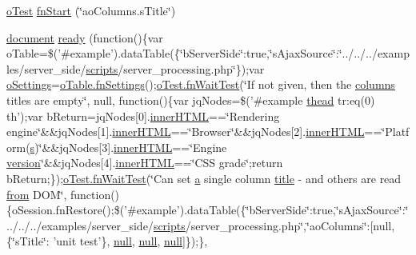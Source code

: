 \begin{DoxyCompactItemize}
\item 
\hyperlink{unit__test_8js_a3b2d259e2df3b6860d9047a92d09d0d6}{o\+Test} \hyperlink{4__server-side_2ao_columns_8s_title_8js_aa9448c4f49cc434654fabb45d95df796}{fn\+Start} (\char`\"{}ao\+Columns.\+s\+Title\char`\"{})
\item 
\hyperlink{outside_events_8js_aa14f8e0338cced6720590fd2ea13bd4b}{document} \hyperlink{4__server-side_2ao_columns_8s_title_8js_ad411188a091c47b7237e30912ec512bd}{ready} (function()\{var o\+Table=\$('\#example').data\+Table(\{\char`\"{}b\+Server\+Side\char`\"{}\+:true,\char`\"{}s\+Ajax\+Source\char`\"{}\+:\char`\"{}../../../examples/server\+\_\+side/\hyperlink{tinymce_8jquery_8dev_8js_a09066d4d580eeec222f858d588b4cdef}{scripts}/server\+\_\+processing.\+php\char`\"{}\});var \hyperlink{model_8settings_8js_a4857b9c813b4dea010668e9555d0aca7}{o\+Settings}=\hyperlink{api_8methods_8js_a78f387fab92a85c2cb7830bc5d8a6141}{o\+Table.\+fn\+Settings}();\hyperlink{onhold_24__server-side_2__zero__config_8js_ab25c4d596771c0133cdc45178ce72c3d}{o\+Test.\+fn\+Wait\+Test}(\char`\"{}If not given, then the \hyperlink{model_8defaults_8columns_8js_af310571d7a4fac04bd949bdefb852a47}{columns} titles are empty\char`\"{}, null, function()\{var jq\+Nodes=\$('\#example \hyperlink{core_8constructor_8js_a856be760b6816c9591ce69f0a2b43693}{thead} tr\+:eq(0) th');var b\+Return=jq\+Nodes\mbox{[}0\mbox{]}.\hyperlink{jquery-ui_8js_a87f73c4f0391c1cf9fe60374a76d9a7b}{inner\+H\+T\+M\+L}==\char`\"{}Rendering engine\char`\"{}\&\&jq\+Nodes\mbox{[}1\mbox{]}.\hyperlink{jquery-ui_8js_a87f73c4f0391c1cf9fe60374a76d9a7b}{inner\+H\+T\+M\+L}==\char`\"{}Browser\char`\"{}\&\&jq\+Nodes\mbox{[}2\mbox{]}.\hyperlink{jquery-ui_8js_a87f73c4f0391c1cf9fe60374a76d9a7b}{inner\+H\+T\+M\+L}==\char`\"{}Platform(\hyperlink{validate_8js_ae059f217efaf1d50696a1214c3ce5748}{s})\char`\"{}\&\&jq\+Nodes\mbox{[}3\mbox{]}.\hyperlink{jquery-ui_8js_a87f73c4f0391c1cf9fe60374a76d9a7b}{inner\+H\+T\+M\+L}==\char`\"{}Engine \hyperlink{jquery-ui_8js_a8fa514f3aed7ddc8bfb00ed5aea5b5e2}{version}\char`\"{}\&\&jq\+Nodes\mbox{[}4\mbox{]}.\hyperlink{jquery-ui_8js_a87f73c4f0391c1cf9fe60374a76d9a7b}{inner\+H\+T\+M\+L}==\char`\"{}C\+S\+S grade\char`\"{};return b\+Return;\});\hyperlink{onhold_24__server-side_2__zero__config_8js_ab25c4d596771c0133cdc45178ce72c3d}{o\+Test.\+fn\+Wait\+Test}(\char`\"{}Can set \hyperlink{media_2js_2jquery_8js_aa4d4888597588a84fd5b1184d00c91f3}{a} single column \hyperlink{jquery_8fancybox_8pack_8js_a293d418e53eecdc63689e8e677088684}{title} -\/ and others are read \hyperlink{jquery-ui_8js_ace03b192fd101a1c5648340bc09b7229}{from} D\+O\+M\char`\"{}, function()\{o\+Session.\+fn\+Restore();\$('\#example').data\+Table(\{\char`\"{}b\+Server\+Side\char`\"{}\+:true,\char`\"{}s\+Ajax\+Source\char`\"{}\+:\char`\"{}../../../examples/server\+\_\+side/\hyperlink{tinymce_8jquery_8dev_8js_a09066d4d580eeec222f858d588b4cdef}{scripts}/server\+\_\+processing.\+php\char`\"{},\char`\"{}ao\+Columns\char`\"{}\+:\mbox{[}null,\{\char`\"{}s\+Title\char`\"{}\+: 'unit test'\}, \hyperlink{validate_8js_afb8e110345c45e74478894341ab6b28e}{null}, \hyperlink{validate_8js_afb8e110345c45e74478894341ab6b28e}{null}, \hyperlink{validate_8js_afb8e110345c45e74478894341ab6b28e}{null}\mbox{]}\});\}, 
\end{DoxyCompactItemize}
